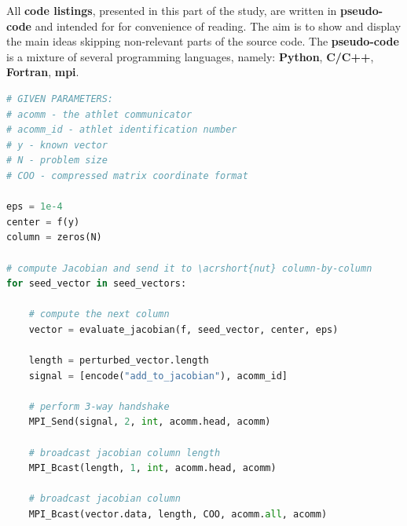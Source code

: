 All \textbf{code listings}, presented in this part of the study, are written in \textbf{pseudo-code} and intended for for convenience of reading. The aim is to show and display the main ideas skipping non-relevant parts of the source code. The \textbf{pseudo-code} is a mixture of several programming languages, namely: \textbf{Python}, \textbf{C/C++}, \textbf{Fortran}, \textbf{\acrshort{mpi}}.\\


\begin{minipage}{\linewidth}
\begin{lstlisting}[language=python, caption={Pseudocode of the default \acrshort{athlet}-\acrshort{nut} coupling: \acrshort{athlet} part}, frame=single, label={lst:athlet-grs-defaul:athlet}]
# GIVEN PARAMETERS:
# acomm - the athlet communicator
# acomm_id - athlet identification number 
# y - known vector
# N - problem size
# COO - compressed matrix coordinate format

eps = 1e-4
center = f(y)
column = zeros(N)

# compute Jacobian and send it to \acrshort{nut} column-by-column
for seed_vector in seed_vectors:

	# compute the next column
	vector = evaluate_jacobian(f, seed_vector, center, eps)
	
	length = perturbed_vector.length
	signal = [encode("add_to_jacobian"), acomm_id]
	
	# perform 3-way handshake
	MPI_Send(signal, 2, int, acomm.head, acomm)
	
	# broadcast jacobian column length
	MPI_Bcast(length, 1, int, acomm.head, acomm)
	
	# broadcast jacobian column
	MPI_Bcast(vector.data, length, COO, acomm.all, acomm)
	

\end{lstlisting}
\end{minipage}



